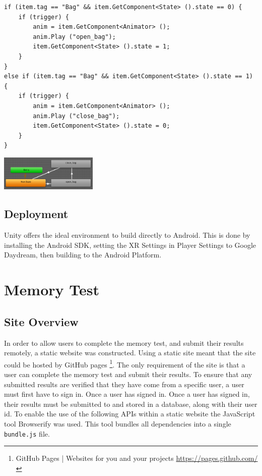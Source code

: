\documentclass[ %
                    author={Elis Jones},
                supervisor={Dr. Kirsten Cater},
                    degree={BSc},
                     title={The Effect of Presentation Medium on Spatial Cognition},
                  subtitle={in the Virtual Environment},
                      year={2018} ]{dissertation}
\begin{document}
\begin{minipage}{\textwidth}
\begin{lstlisting}
if (item.tag == "Bag" && item.GetComponent<State> ().state == 0) {
	if (trigger) {
		anim = item.GetComponent<Animator> ();
		anim.Play ("open_bag");
		item.GetComponent<State> ().state = 1;
	}
}	
else if (item.tag == "Bag" && item.GetComponent<State> ().state == 1) {
	if (trigger) {
		anim = item.GetComponent<Animator> ();
		anim.Play ("close_bag");
		item.GetComponent<State> ().state = 0;
	} 
}

\end{lstlisting}
\label{anim_script}
\end{minipage}

\begin{minipage}{\textwidth}
    \centering
    \begin{center}
        \includegraphics[width=0.35\textwidth]{images/animator.png}
        \label{animator}
    \end{center}
\end{minipage}

\subsection{Deployment}
Unity offers the ideal environment to build directly to Android. This is done by installing the Android SDK, setting the XR Settings in Player Settings to Google Daydream, then building to the Android Platform. 


\section{Memory Test}
\subsection{Site Overview}
In order to allow users to complete the memory test, and submit their results remotely, a static website was constructed. Using a static site meant that the site could be hosted by GitHub pages \footnote{GitHub Pages | Websites for you and your projects \url{https://pages.github.com/}}. The only requirement of the site is that a user can complete the memory test and submit their results. To ensure that any submitted results are verified that they have come from a specific user, a user must first have to sign in. Once a user has signed in. Once a user has signed in, their results must be submitted to and stored in a database, along with their user id. To enable the use of the following APIs within a static website the JavaScript tool Browserify was used. This tool bundles all dependencies into a single \lstinline{bundle.js} file.  
\end{document}
